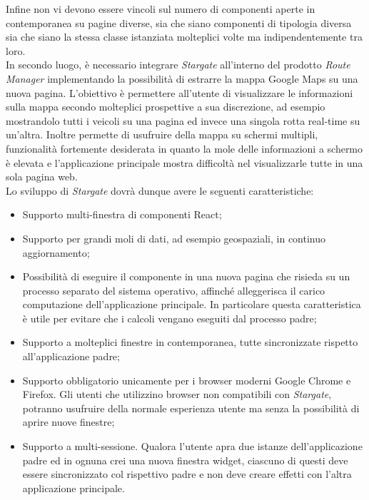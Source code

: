 Infine non vi devono essere vincoli sul numero di componenti aperte in contemporanea su pagine diverse, sia che siano componenti di tipologia diversa sia che siano la stessa classe istanziata molteplici volte ma indipendentemente tra loro.\\

In secondo luogo, è necessario integrare \textit{Stargate} all'interno del prodotto \textit{Route Manager} implementando la possibilità di estrarre la mappa Google Maps su una nuova pagina. L'obiettivo è permettere all'utente di visualizzare le informazioni sulla mappa secondo molteplici prospettive a sua discrezione, ad esempio mostrandolo tutti i veicoli su una pagina ed invece una singola rotta real-time su un'altra. Inoltre permette di usufruire della mappa su schermi multipli, funzionalità fortemente desiderata in quanto la mole delle informazioni a schermo è elevata e l'applicazione principale mostra difficoltà nel visualizzarle tutte in una sola pagina web.\\

Lo sviluppo di \textit{Stargate} dovrà dunque avere le seguenti caratteristiche:

\begin{itemize}
    \item Supporto multi-finestra di componenti React;
    \item Supporto per grandi moli di dati, ad esempio geospaziali, in continuo aggiornamento;
    \item Possibilità di eseguire il componente in una nuova pagina che risieda su un processo separato del sistema operativo, affinché alleggerisca il carico computazione dell'applicazione principale. In particolare questa caratteristica è utile per evitare che i calcoli vengano eseguiti dal processo padre;
    \item Supporto a molteplici finestre in contemporanea, tutte sincronizzate rispetto all'applicazione padre;
    \item Supporto obbligatorio unicamente per i browser moderni Google Chrome e Firefox. Gli utenti che utilizzino browser non compatibili con \textit{Stargate}, potranno usufruire della normale esperienza utente ma senza la possibilità di aprire nuove finestre;
    \item Supporto a multi-sessione. Qualora l'utente apra due istanze dell'applicazione padre ed in ognuna crei una nuova finestra widget, ciascuno di questi deve essere sincronizzato col rispettivo padre e non deve creare effetti con l'altra applicazione principale.
\end{itemize}

